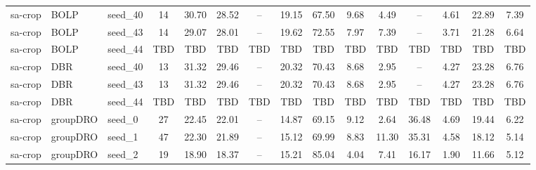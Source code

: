 \documentclass[11pt]{article}
\begin{document}
\begin{table}[h!]
{\begin{tabular}{lllcccccccccccc}
sa-crop & BOLP & seed\_40 & 14 & 30.70 & 28.52 & -- & 19.15 & 67.50 & 9.68 & 4.49 & -- & 4.61 & 22.89 & 7.39 \\
sa-crop & BOLP & seed\_43 & 14 & 29.07 & 28.01 & -- & 19.62 & 72.55 & 7.97 & 7.39 & -- & 3.71 & 21.28 & 6.64 \\
sa-crop & BOLP & seed\_44 & TBD & TBD & TBD & TBD & TBD & TBD & TBD & TBD & TBD & TBD & TBD & TBD \\

sa-crop & DBR & seed\_40 & 13 & 31.32 & 29.46 & -- & 20.32 & 70.43 & 8.68 & 2.95 & -- & 4.27 & 23.28 & 6.76 \\
sa-crop & DBR & seed\_43 & 13 & 31.32 & 29.46 & -- & 20.32 & 70.43 & 8.68 & 2.95 & -- & 4.27 & 23.28 & 6.76 \\
sa-crop & DBR & seed\_44 & TBD & TBD & TBD & TBD & TBD & TBD & TBD & TBD & TBD & TBD & TBD & TBD \\

sa-crop & groupDRO & seed\_0 & 27 & 22.45 & 22.01 & -- & 14.87 & 69.15 & 9.12 & 2.64 & 36.48 & 4.69 & 19.44 & 6.22 \\
sa-crop & groupDRO & seed\_1 & 47 & 22.30 & 21.89 & -- & 15.12 & 69.99 & 8.83 & 11.30 & 35.31 & 4.58 & 18.12 & 5.14 \\
sa-crop & groupDRO & seed\_2 & 19 & 18.90 & 18.37 & -- & 15.21 & 85.04 & 4.04 & 7.41 & 16.17 & 1.90 & 11.66 & 5.12 \\
\bottomrule
\end{tabular}%
}
\end{table}


\end{document}
